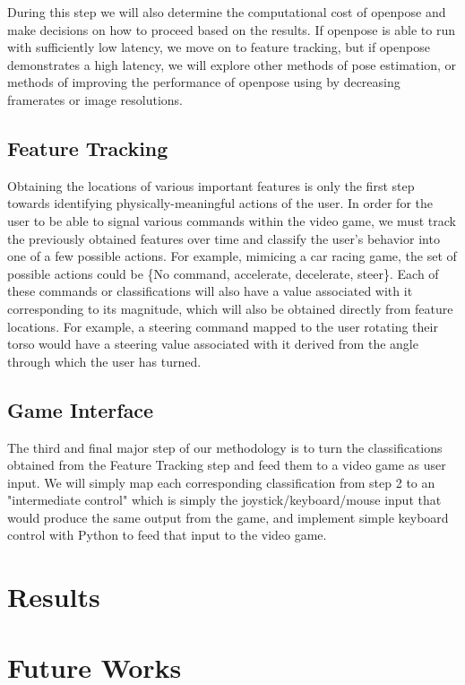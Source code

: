 \documentclass[10pt,twocolumn,letterpaper]{article}
\begin{document}
During this step we will also determine the computational cost of openpose and make decisions on 
how to proceed based on the results. If openpose is able to run with sufficiently low latency, we 
move on to feature tracking, but if openpose demonstrates a high latency, we will explore other 
methods of pose estimation, or methods of improving the performance of openpose using by decreasing 
framerates or image resolutions.

\subsection{Feature Tracking}
Obtaining the locations of various important features is only the first step towards identifying 
physically-meaningful actions of the user. In order for the user to be able to signal various 
commands within the video game, we must track the previously obtained features over time and 
classify the user's behavior into one of a few possible actions. For example, mimicing a car 
racing game, the set of possible actions could be \{No command, accelerate, decelerate, steer\}. 
Each of these commands or classifications will also have a value associated with it corresponding 
to its magnitude, which will also be obtained directly from feature locations. For example, a steering 
command mapped to the user rotating their torso would have a steering value associated with it 
derived from the angle through which the user has turned. 

\subsection{Game Interface}
The third and final major step of our methodology is to turn the classifications obtained from 
the Feature Tracking step and feed them to a video game as user input. We will simply map each 
corresponding classification from step 2 to an "intermediate control" which is simply the 
joystick/keyboard/mouse input that would produce the same output from the game, and implement 
simple keyboard control with Python to feed that input to the video game.

\section{Results}

\section{Future Works}

{\small


}
\end{document}
